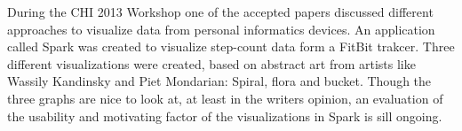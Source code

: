 During the CHI 2013 Workshop \cite{chi2013} one of the accepted papers discussed different approaches to visualize data from personal informatics devices. %
An application called Spark was created to visualize step-count data form a FitBit trakcer. %
Three different visualizations were created, based on abstract art from artists like Wassily Kandinsky and Piet Mondarian: Spiral, flora and bucket. %
Though the three graphs are nice to look at, at least in the writers opinion, an evaluation of the usability and motivating factor of the visualizations in Spark is sill ongoing. 
